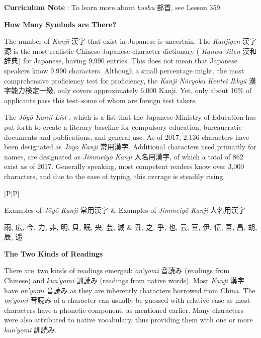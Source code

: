 \par{\textbf{Curriculum Note }: To learn more about \emph{bushu }部首, see Lesson 359. }

\begin{center}
\textbf{How Many Symbols are There? }\hfill\break

\end{center}

\par{ The number of \emph{Kanji }漢字 that exist in Japanese is uncertain. The \emph{Kanjigen }漢字源 is the most realistic Chinese-Japanese character dictionary ( \emph{Kanwa Jiten }漢和辞典) for Japanese, having 9,990 entries. This does not mean that Japanese speakers know 9,990 characters. Although a small percentage might, the most comprehensive proficiency test for proficiency, the \emph{Kanji Nōryoku Kentei Ikkyū }漢字能力検定一級, only covers approximately 6,000 Kanji. Yet, only about 10\% of applicants pass this test--some of whom are foreign test takers. }

\par{ The \emph{Jōyō Kanji List }, which is a list that the Japanese Ministry of Education has put forth to create a literary baseline for compulsory education, bureaucratic documents and publications, and general use. As of 2017, 2,136 characters have been designated as \emph{Jōyō Kanji }常用漢字. Additional characters used primarily for names, are designated as \emph{Jimmeiyō Kanji }人名用漢字, of which a total of 862 exist as of 2017. Generally speaking, most competent readers know over 3,000 characters, and due to the ease of typing, this average is steadily rising. }

\begin{ltabulary}{|P|P|}
\hline 

Examples of \emph{Jōyō Kanji }常用漢字 & Examples of \emph{Jimmeiyō Kanji }人名用漢字 \\ 

雨, 広, 今, 力, 非, 明, 貝, 眠, 央, 芸, 減 & 丑, 之, 乎, 也, 云, 亘, 伊, 伍, 吾, 昌, 胡, 辰, 遥 \\ 

\end{ltabulary}

\begin{center}
\textbf{\hfill\break
The Two Kinds of Readings }
\end{center}

\par{ There are two kinds of readings emerged: \emph{on'yomi }音読み (readings from Chinese) and \emph{kun'yomi }訓読み (readings from native words). Most \emph{Kanji }漢字 have \emph{on'yomi }音読み as they \emph{ }are inherently characters borrowed from China. The \emph{on'yomi }音読み of a character can usually be guessed with relative ease as most characters have a phonetic component, as mentioned earlier. Many characters were also attributed to native vocabulary, thus providing them with one or more \emph{kun'yomi }訓読み. }

